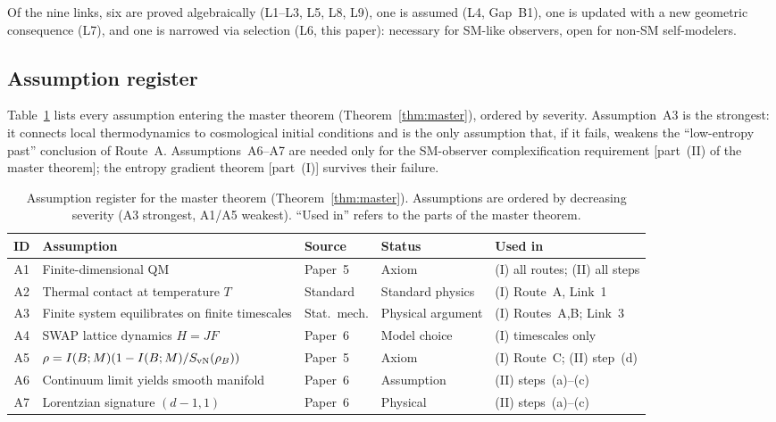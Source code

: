 \noindent
Of the nine links, six are proved algebraically (L1--L3, L5, L8,
L9), one is assumed (L4, Gap~B1), one is updated with a new
geometric consequence (L7), and one is narrowed via selection (L6,
this paper): necessary for SM-like observers, open for non-SM
self-modelers.

\subsection{Assumption register}\label{sec:assumption-register}

Table~\ref{tab:assumptions} lists every assumption entering the
master theorem (Theorem~\ref{thm:master}), ordered by severity.
Assumption~A3 is the strongest: it connects local thermodynamics to
cosmological initial conditions and is the only assumption that, if
it fails, weakens the ``low-entropy past'' conclusion of
Route~A\@.  Assumptions~A6--A7 are needed only for the
SM-observer complexification requirement [part~(II) of the master
theorem]; the entropy gradient theorem [part~(I)] survives their
failure.

\begin{table}[t]
  \centering
  \caption{Assumption register for the master theorem
  (Theorem~\ref{thm:master}).  Assumptions are ordered by decreasing
  severity (A3 strongest, A1/A5 weakest).  ``Used in'' refers to the
  parts of the master theorem.}
  \label{tab:assumptions}
  \begin{tabular}{cllll}
    \toprule
    ID & Assumption & Source & Status
       & Used in \\
    \midrule
    A1 & Finite-dimensional QM
       & Paper~5~\cite{Paper5}
       & Axiom
       & (I) all routes; (II) all steps \\
    A2 & Thermal contact at temperature $T$
       & Standard~\cite{ReebWolf2014}
       & Standard physics
       & (I) Route~A, Link~1 \\
    A3 & Finite system equilibrates on finite timescales
       & Stat.\ mech.
       & Physical argument
       & (I) Routes~A,B; Link~3 \\
    A4 & SWAP lattice dynamics $H = JF$
       & Paper~6~\cite{Paper6}
       & Model choice
       & (I) timescales only \\
    A5 & $\rho = I(B;M)(1 - I(B;M)/S_{\mathrm{vN}}(\rho_B))$
       & Paper~5~\cite{Paper5}
       & Axiom
       & (I) Route~C; (II) step~(d) \\
    A6 & Continuum limit yields smooth manifold
       & Paper~6~\cite{Paper6}
       & Assumption
       & (II) steps~(a)--(c) \\
    A7 & Lorentzian signature $(d{-}1,1)$
       & Paper~6~\cite{Paper6}
       & Physical
       & (II) steps~(a)--(c) \\
    \bottomrule
  \end{tabular}
\end{table}

